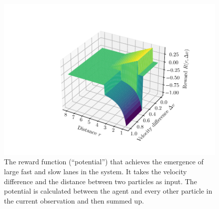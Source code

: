 \begin{figure}[H]
    \centering
    \includegraphics{lane_reward_func_3d_cropped.pdf}
    \caption{The reward function (\enquote{potential}) that achieves the emergence of large fast and slow lanes in the system. It takes the velocity difference and the distance between two particles as input. The potential is calculated between the agent and every other particle in the current observation and then summed up.}
    \label{fig:lane_reward_func_3d}
\end{figure}

